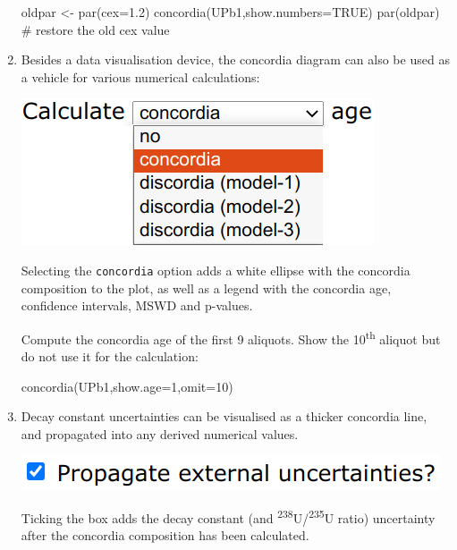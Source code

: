 \begin{refsection}
\begin{enumerate}
\begin{script}
oldpar <- par(cex=1.2)
concordia(UPb1,show.numbers=TRUE)
par(oldpar) # restore the old cex value
\end{script}

\item Besides a data visualisation device, the concordia diagram can
  also be used as a vehicle for various numerical calculations:

\noindent\begin{minipage}[t]{.3\linewidth}
  \strut\vspace*{-\baselineskip}\newline
  \includegraphics[width=\linewidth]{../figures/ConcordiaShowAge.png}
\end{minipage}
\begin{minipage}[t]{.7\linewidth}
  Selecting the \texttt{concordia} option adds a white ellipse with
  the concordia composition to the plot, as well as a legend with the
  concordia age, confidence intervals, MSWD and p-values.
\end{minipage}

Compute the concordia age of the first 9 aliquots. Show the
10\textsuperscript{th} aliquot but do not use it for the calculation:

\begin{console}
concordia(UPb1,show.age=1,omit=10)
\end{console}

\item Decay constant uncertainties can be visualised as a thicker
  concordia line, and propagated into any derived numerical values.

\noindent\begin{minipage}[t]{.35\linewidth}
\strut\vspace*{-\baselineskip}\newline
\includegraphics[width=\linewidth]{../figures/concordiaexterr.png}
\end{minipage}
\begin{minipage}[t]{.65\linewidth}
  Ticking the box adds the decay constant (and
  \textsuperscript{238}U/\textsuperscript{235}U ratio) uncertainty
  after the concordia composition has been calculated.
\end{minipage}


\end{enumerate}
\end{refsection}
